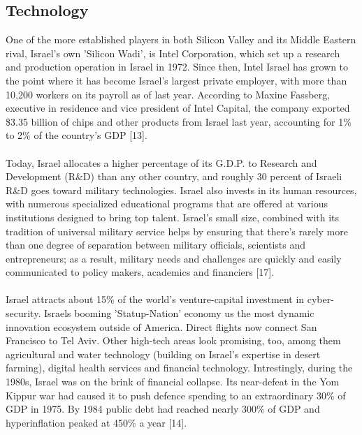 \documentclass[10pt]{article}
\begin{document}
\subsection{Technology }
One of the more established players in both Silicon Valley and its Middle Eastern rival, Israel's own 'Silicon Wadi', is Intel Corporation, which set up a research and production operation in Israel in 1972. Since then, Intel Israel has grown to the point where it has become Israel’s largest private employer, with more than 10,200 workers on its payroll as of last year. According to Maxine Fassberg, executive in residence and vice president of Intel Capital, the company exported \$3.35 billion of chips and other products from Israel last year, accounting for 1\% to 2\% of the country’s GDP [13].
\\
\\
Today, Israel allocates a higher percentage of its G.D.P. to Research and Development (R\&D) than any other country, and roughly 30 percent of Israeli R\&D goes toward military technologies. Israel also invests in its human resources, with numerous specialized educational programs that are offered at various institutions designed to bring top talent. Israel’s small size, combined with its tradition of universal military service helps by ensuring that there's rarely more than one degree of separation between military officials, scientists and entrepreneurs; as a result, military needs and challenges are quickly and easily communicated to policy makers, academics and financiers [17].
\\
\\
Israel attracts about 15\% of the world’s venture-capital investment in cyber-security. Israels booming 'Statup-Nation' economy us the most dynamic innovation ecosystem outside of America. Direct flights now connect San Francisco to Tel Aviv. Other high-tech areas look promising, too, among them agricultural and water technology (building on Israel’s expertise in desert farming), digital health services and financial technology. Intrestingly, during the 1980s, Israel was on the brink of financial collapse. Its near-defeat in the Yom Kippur war had caused it to push defence spending to an extraordinary 30\% of GDP in 1975. By 1984 public debt had reached nearly 300\% of GDP and hyperinflation peaked at 450\% a year [14].
\\
\\
\end{document}
